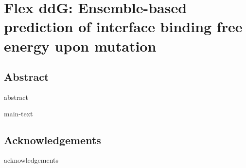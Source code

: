 \chapter{Flex ddG: Ensemble-based prediction of interface binding free energy upon mutation}
\label{chapter:flex-ddG}

\section{Abstract}
{abstract}

{main-text}

\section{Acknowledgements}
{acknowledgements}
